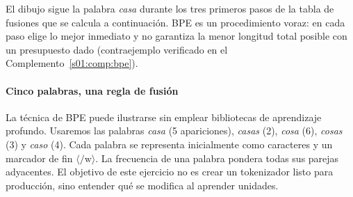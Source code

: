 \begin{center}
\end{center}
\noindent El dibujo sigue la palabra \emph{casa} durante los tres primeros pasos
de la tabla de fusiones que se calcula a continuación. BPE es un procedimiento
voraz: en cada paso elige lo mejor inmediato y no garantiza la menor longitud
total posible con un presupuesto dado (contraejemplo verificado en el
Complemento~\ref{s01:comp:bpe}).
\paragraph{Cinco palabras, una regla de fusión}
La técnica de BPE puede ilustrarse sin emplear bibliotecas de aprendizaje profundo. Usaremos las palabras \emph{casa} (5 apariciones), \emph{casas} (2), \emph{cosa} (6), \emph{cosas} (3) y \emph{caso} (4). Cada palabra se representa inicialmente como caracteres y un marcador de fin $\langle/\mathrm{w}\rangle$. La frecuencia de una palabra pondera todas sus parejas adyacentes. El objetivo de este ejercicio no es crear un tokenizador listo para producción, sino entender qué se modifica al aprender unidades.

